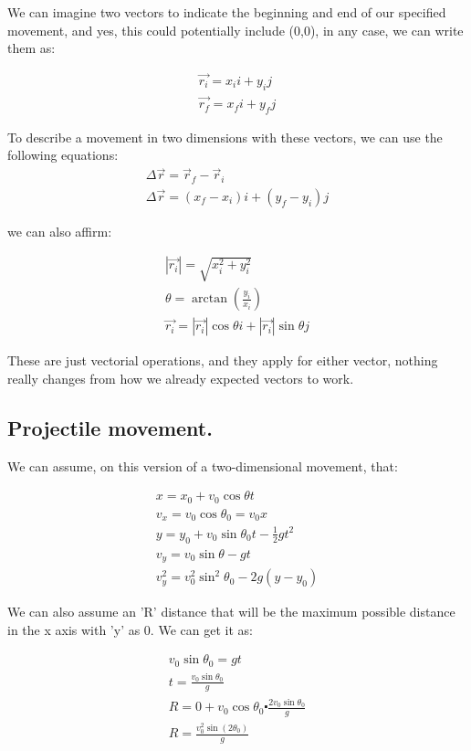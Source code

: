 \documentclass[11pt,fleqn]{book} %
\begin{document}
We can imagine two vectors to indicate the beginning and end of our specified movement, and yes, this
could potentially include (0,0), in any case, we can write them as:

\begin{gather}
    \vec{r_i} = x_i i + y_i j \\
    \vec{r_f} = x_f i + y_f j
\end{gather}

To describe a movement in two dimensions with these vectors, we can use the following equations:
\begin{gather}
    \Delta \vec{r} = \vec{r}_f - \vec{r}_i \\
    \Delta \vec{r} =  (x_f - x_i) i + (y_f - y_i) j 
\end{gather}

we can also affirm:

\begin{gather}
    |\vec{r_i}| = \sqrt{x_i^2 + y_i^2} \\
    \theta = \arctan(\frac{y_i}{x_i}) \\
    \vec{r_i} = |\vec{r_i}| \cos \theta i + |\vec{r_i}| \sin \theta j
\end{gather}

These are just vectorial operations, and they apply for either vector, nothing really changes from
how we already expected vectors to work. 


\subsection{Projectile movement.}

We can assume, on this version of a two-dimensional movement, that:

\begin{gather}
    x = x_0 + v_0 \cos \theta t \\
    v_x = v_0 \cos \theta_0 = v_0 x \\
    y = y_0 + v_0 \sin \theta_0 t - \frac{1}{2} gt^2 \\
    v_y = v_0 \sin \theta - gt \\
    v_y^2 = v_0^2 \sin^2 \theta_0 - 2g (y - y_0)
\end{gather}

We can also assume an 'R' distance that will be the maximum possible distance in the x axis
with 'y' as 0. We can get it as:

\begin{gather}
    v_0 \sin \theta_0 = gt \\
    t = \frac{v_0 \sin \theta_0}{g} \\
    R = 0 + v_0 \cos \theta_0 \centerdot \frac{2 v_0 \sin \theta_0}{g} \\
    R = \frac{v_0^2 \sin(2 \theta_0)}{g}
\end{gather}
\end{document}
